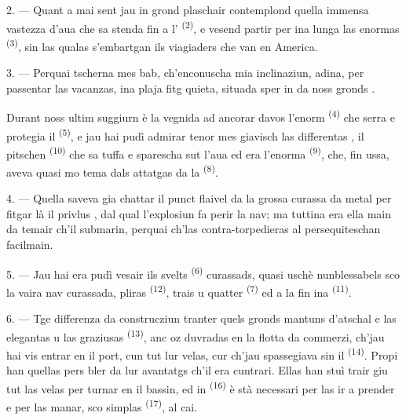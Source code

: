 2. --- Quant a mai sent jau in grond plaschair contemplond quella immensa vastezza
d'aua che sa stenda fin a l' \textsuperscript{(2)}, e vesend partir per ina
lunga  las enormas  \textsuperscript{(3)}, sin las
qualas s'embartgan ils viagiaders che van en America.

3. --- Perquai tscherna mes bab, ch'enconuscha mia inclinaziun, adina, per passentar
las vacanzas, ina plaja fitg quieta, situada sper in da noss gronds .

Durant noss ultim suggiurn è la  vegnida ad ancorar davos l'enorm
 \textsuperscript{(4)} che serra e protegia il 
\textsuperscript{(5)}, e jau hai pudì admirar tenor mes giavisch las differentas
, il pitschen  \textsuperscript{(10)} che sa tuffa e
sparescha sut l'aua ed era l'enorma  \textsuperscript{(9)}, che, fin
ussa, aveva quasi mo tema dals attatgas da la 
\textsuperscript{(8)}.

\VUsaut{3.0mm}
\VUsaut{3.0mm}

4. --- Quella saveva gia  chattar il punct flaivel da la grossa
curassa da metal per fitgar là il privlus , dal qual l'explosiun fa
perir la nav; ma tuttina era ella main da temair ch'il submarin, perquai ch'las
contra-torpedieras al persequiteschan facilmain.

5. --- Jau hai era pudì vesair ils svelts  \textsuperscript{(6)}
curassads, quasi uschè nunblessabels sco la vaira nav curassada, pliras  \textsuperscript{(12)}, trais u quatter 
\textsuperscript{(7)} ed a la fin ina  \textsuperscript{(11)}.

6. --- Tge differenza da construcziun tranter quels gronds mantuns d'atschal e las
elegantas  u las graziusas  \textsuperscript{(13)},
anc oz duvradas en la flotta da commerzi, ch'jau hai vis entrar en il port, cun tut
lur velas, cur ch'jau spassegiava sin il  \textsuperscript{(14)}. Propi han
quellas pers bler da lur avantatgs  ch'il  era cuntrari. Ellas
han stuì trair giu tut las velas per turnar en il bassin, ed in 
\textsuperscript{(16)} è stà necessari per las ir a prender e per las manar, sco simplas
 \textsuperscript{(17)}, al cai.

